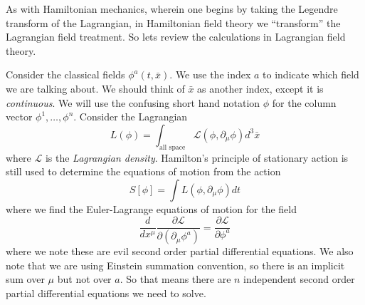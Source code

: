 
As with Hamiltonian mechanics, wherein one begins by taking the
Legendre transform of the Lagrangian, in Hamiltonian field theory
we ``transform'' the Lagrangian field treatment. So lets review
the calculations in Lagrangian field theory.

Consider the classical fields $\phi^{a}(t,\bar{x})$. We use the
index $a$ to indicate which field we are talking about. We should
think of $\bar{x}$ as another index, except it is \emph{continuous}.
We will use the confusing short hand notation $\phi$ for the
column vector $\phi^{1},\ldots,\phi^{n}$. Consider the Lagrangian
\begin{equation}%
L(\phi) = \int_{\text{all space}}\mathcal{L}(\phi,\partial_{\mu}\phi)d^{3}\bar{x}
\end{equation}
where $\mathcal{L}$ is the \emph{Lagrangian density}. Hamilton's
principle of stationary action is still used to determine the
equations of motion from the action
\begin{equation}%
S[\phi] = \int L(\phi,\partial_{\mu}\phi)dt
\end{equation}
where we find the Euler-Lagrange equations of motion for the field
\begin{equation}%
\frac{d}{dx^{\mu}}\frac{\partial\mathcal{L}}{\partial (\partial_{\mu}\phi^{a})}=\frac{\partial\mathcal{L}}{\partial\phi^{a}}
\end{equation}
where we note these are evil second order partial differential
equations. We also note that we are using Einstein summation
convention, so there is an implicit sum over $\mu$ but not over
$a$. So that means there are $n$ independent second order
partial differential equations we need to solve.

